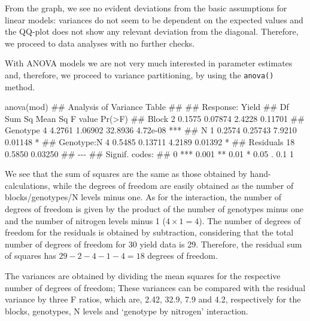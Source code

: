 \documentclass[a4paper,12pt,oneside]{book}
\newenvironment{Shaded}{\begin{snugshade}}{\end{snugshade}}
\newcommand{\DocumentationTok}[1]{#1}
\newcommand{\FunctionTok}[1]{#1}
\newcommand{\NormalTok}[1]{#1}
\begin{document}
From the graph, we see no evident deviations from the basic assumptions for linear models: variances do not seem to be dependent on the expected values and the QQ-plot does not show any relevant deviation from the diagonal. Therefore, we proceed to data analyses with no further checks.

With ANOVA models we are not very much interested in parameter estimates and, therefore, we proceed to variance partitioning, by using the \texttt{anova()} method.

\vspace{12pt}
\footnotesize

\begin{Shaded}
\begin{Highlighting}[]
\FunctionTok{anova}\NormalTok{(mod)}
\DocumentationTok{\#\# Analysis of Variance Table}
\DocumentationTok{\#\# }
\DocumentationTok{\#\# Response: Yield}
\DocumentationTok{\#\#            Df Sum Sq Mean Sq F value   Pr(\textgreater{}F)    }
\DocumentationTok{\#\# Block       2 0.1575 0.07874  2.4228  0.11701    }
\DocumentationTok{\#\# Genotype    4 4.2761 1.06902 32.8936 4.72e{-}08 ***}
\DocumentationTok{\#\# N           1 0.2574 0.25743  7.9210  0.01148 *  }
\DocumentationTok{\#\# Genotype:N  4 0.5485 0.13711  4.2189  0.01392 *  }
\DocumentationTok{\#\# Residuals  18 0.5850 0.03250                     }
\DocumentationTok{\#\# {-}{-}{-}}
\DocumentationTok{\#\# Signif. codes:  }
\DocumentationTok{\#\# 0 \textquotesingle{}***\textquotesingle{} 0.001 \textquotesingle{}**\textquotesingle{} 0.01 \textquotesingle{}*\textquotesingle{} 0.05 \textquotesingle{}.\textquotesingle{} 0.1 \textquotesingle{} \textquotesingle{} 1}
\end{Highlighting}
\end{Shaded}

\normalsize

We see that the sum of squares are the same as those obtained by hand-calculations, while the degrees of freedom are easily obtained as the number of blocks/genotypes/N levels minus one. As for the interaction, the number of degrees of freedom is given by the product of the number of genotypes minus one and the number of nitrogen levels minus 1 (\(4 \times 1 = 4\)). The number of degrees of freedom for the residuals is obtained by subtraction, considering that the total number of degrees of freedom for 30 yield data is 29. Therefore, the residual sum of squares has \(29 - 2 - 4 - 1 - 4 = 18\) degrees of freedom.

The variances are obtained by dividing the mean squares for the respective number of degrees of freedom; These variances can be compared with the residual variance by three F ratios, which are, 2.42, 32.9, 7.9 and 4.2, respectively for the blocks, genotypes, N levels and `genotype by nitrogen' interaction.
\end{document}
